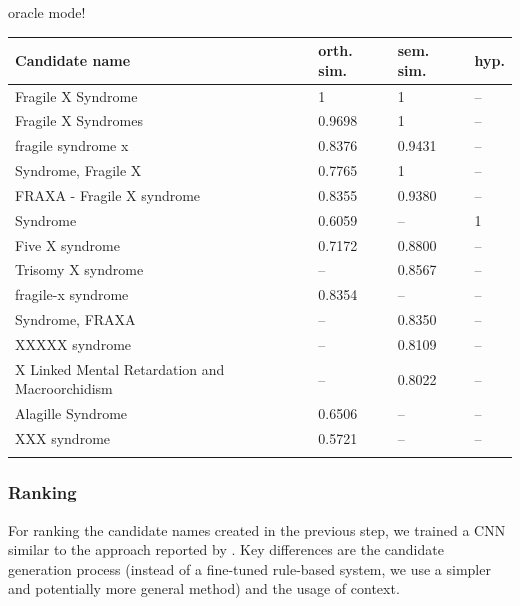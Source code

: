 \documentclass{bioinfo}
\begin{document}
oracle mode!

\begin{table}[!t]
{\begin{tabular}{@{}llll@{}}\toprule
  Candidate name & orth. sim. & sem. sim. & hyp.\\\midrule
  Fragile X Syndrome                             & 1      & 1      & --\\
  Fragile X Syndromes                            & 0.9698 & 1      & --\\
  fragile syndrome x                             & 0.8376 & 0.9431 & --\\
  Syndrome, Fragile X                            & 0.7765 & 1      & --\\
  FRAXA - Fragile X syndrome                     & 0.8355 & 0.9380 & --\\
  Syndrome                                       & 0.6059 & --     & 1 \\
  Five X syndrome                                & 0.7172 & 0.8800 & --\\
  Trisomy X syndrome                             & --     & 0.8567 & --\\
  fragile-x syndrome                             & 0.8354 & --     & --\\
  Syndrome, FRAXA                                & --     & 0.8350 & --\\
  XXXXX syndrome                                 & --     & 0.8109 & --\\
  X Linked Mental Retardation and Macroorchidism & --     & 0.8022 & --\\
  Alagille Syndrome                              & 0.6506 & --     & --\\
  XXX syndrome                                   & 0.5721 & --     & --\\
  \botrule
\end{tabular}}{}
\end{table}

\subsubsection{Ranking}
\label{ssub:ranking}

For ranking the candidate names created in the previous step, we trained a CNN similar to the approach reported by \cite{lihaodi-et-al:2017}.
Key differences are the candidate generation process (instead of a fine-tuned rule-based system, we use a simpler and potentially more general method) and the usage of context.
\end{document}
